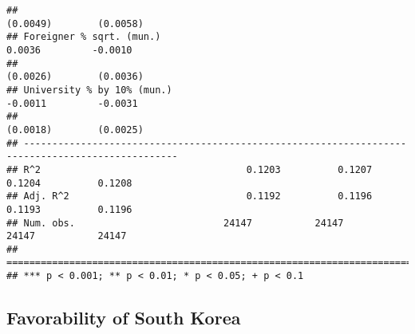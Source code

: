 \documentclass[
]{article}
\begin{document}
\begin{verbatim}
##                                                                       (0.0049)        (0.0058)   
## Foreigner % sqrt. (mun.)                                               0.0036         -0.0010    
##                                                                       (0.0026)        (0.0036)   
## University % by 10% (mun.)                                            -0.0011         -0.0031    
##                                                                       (0.0018)        (0.0025)   
## -------------------------------------------------------------------------------------------------
## R^2                                    0.1203          0.1207          0.1204          0.1208    
## Adj. R^2                               0.1192          0.1196          0.1193          0.1196    
## Num. obs.                          24147           24147           24147           24147         
## =================================================================================================
## *** p < 0.001; ** p < 0.01; * p < 0.05; + p < 0.1
\end{verbatim}

\hypertarget{favorability-of-south-korea}{%
\subsection{Favorability of South
Korea}\label{favorability-of-south-korea}}
\end{document}
